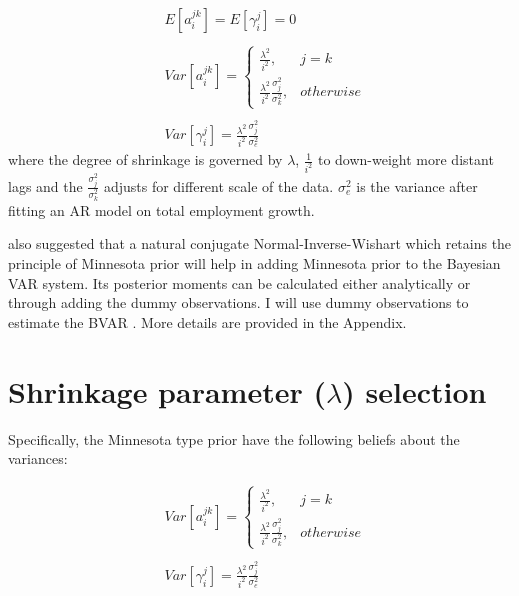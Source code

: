\documentclass{monashthesis}
\begin{document}
\[
\begin{aligned}\label{eq:1}
&E[a_{i}^{jk}] = E[\gamma_{i}^j]=0\\
\\
&Var[a_i^{jk}]= 
\begin{cases}
\frac{\lambda^2}{i^2},&j=k\\
\frac{\lambda^2}{i^2}\frac{\sigma^2_{j}}{\sigma^2_k},& otherwise
\end{cases}\\
\\
&Var[\gamma_i^{j}]=\frac{\lambda^2}{i^2}\frac{\sigma^2_{j}}{\sigma^2_e}
\end{aligned}
\]
where the degree of shrinkage is governed by \(\lambda\), \(\frac{1}{i^2}\) to down-weight more distant lags and the \(\frac{\sigma_j^2}{\sigma_k^2}\) adjusts for different scale of the data. \(\sigma^2_e\) is the variance after fitting an AR model on total employment growth.

\textcite{banbura2010large} also suggested that a natural conjugate Normal-Inverse-Wishart which retains the principle of Minnesota prior will help in adding Minnesota prior to the Bayesian VAR system. Its posterior moments can be calculated either analytically or through adding the dummy observations. I will use dummy observations to estimate the BVAR \autocite{banbura2010large}. More details are provided in the Appendix.

\newpage

\hypertarget{shrinkage-parameter-lambda-selection}{%
\section{\texorpdfstring{Shrinkage parameter (\(\lambda\)) selection}{Shrinkage parameter (\textbackslash lambda) selection}}\label{shrinkage-parameter-lambda-selection}}

Specifically, the Minnesota type prior have the following beliefs about the variances:

\[
\begin{aligned}
&Var[a_i^{jk}]= 
\begin{cases}
\frac{\lambda^2}{i^2},&j=k\\
\frac{\lambda^2}{i^2}\frac{\sigma^2_{j}}{\sigma^2_k},& otherwise
\end{cases}\\
\\
&Var[\gamma_i^{j}]=\frac{\lambda^2}{i^2}\frac{\sigma^2_{j}}{\sigma^2_e}
\end{aligned}
\]
\end{document}
